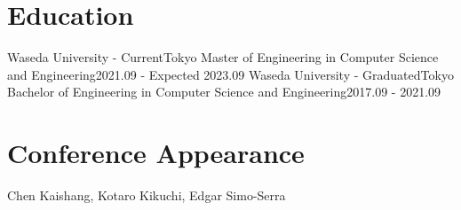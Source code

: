 \resumeSubHeadingListEnd
\vspace{5pt}


\section{Education}
\vspace{5pt}
\resumeSubHeadingListStart
    \resumeSubheading
      {Waseda University - Current}{Tokyo}
      {Master of Engineering in Computer Science and Engineering}{2021.09 - Expected 2023.09}
    \resumeSubheading
      {Waseda University - Graduated}{Tokyo}
      {Bachelor of Engineering in Computer Science and Engineering}{2017.09 - 2021.09}
\resumeSubHeadingListEnd
\vspace{5pt}
\section{Conference Appearance}
\vspace{5pt}
\resumeSubHeadingListStart
{}
{Chen Kaishang, Kotaro Kikuchi, Edgar Simo-Serra}{}
\resumeSubHeadingListEnd
\vspace{5pt}

